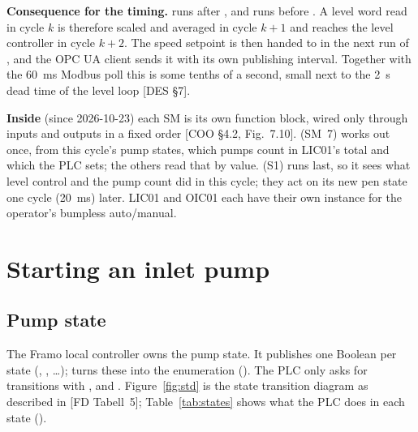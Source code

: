 \documentclass[11pt]{article}
\begin{document}
\textbf{Consequence for the timing.}  runs after , and
 runs before . A level word read in cycle $k$ is therefore
scaled and averaged in cycle $k+1$ and reaches the level controller in cycle $k+2$. The speed
setpoint is then handed to  in the next run of
, and the OPC UA client sends it with its own publishing interval. Together
with the 60~ms Modbus poll this is some tenths of a second, small next to the 2~s dead time of the
level loop [DES \S7].

\textbf{Inside } (since 2026-10-23) each SM is its own function block, wired only
through inputs and outputs in a fixed order [COO \S4.2, Fig.~7.10].  (SM~7) works out
once, from this cycle's pump states, which pumps count in LIC01's total and which the PLC sets; the others
read that by value.  (S1) runs last, so it sees what level control and the pump count did
in this cycle; they act on its new pen state one cycle (20~ms) later. LIC01 and OIC01 each have their own
 instance for the operator's bumpless auto/manual.

\section{Starting an inlet pump}
\label{sec:start}

\subsection{Pump state}
\label{sec:state}

The Framo local controller owns the pump state. It publishes one Boolean per state
(, , \ldots);  turns these into
the enumeration  (). The PLC only
asks for transitions with ,  and . Figure~\ref{fig:std} is the state
transition diagram as described in [FD Tabell~5]; Table~\ref{tab:states} shows what the PLC does in
each state ().
\end{document}
